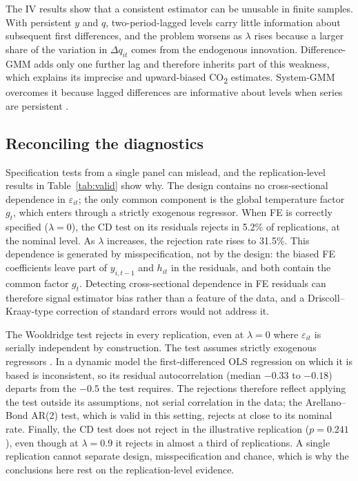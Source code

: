 \documentclass[11pt,a4paper]{article}
\newcommand{\COtwo}{CO\textsubscript{2}}
\begin{document}
The IV results show that a consistent estimator can be unusable in finite samples. With persistent $y$ and $q$, two-period-lagged levels carry little information about subsequent first differences, and the problem worsens as $\lambda$ rises because a larger share of the variation in $\Delta q_{it}$ comes from the endogenous innovation. Difference-GMM adds only one further lag and therefore inherits part of this weakness, which explains its imprecise and upward-biased \COtwo{} estimates. System-GMM overcomes it because lagged differences are informative about levels when series are persistent \citep{Blundell1998}.

\subsection{Reconciling the diagnostics}\label{sec:recon}

Specification tests from a single panel can mislead, and the replication-level results in Table~\ref{tab:valid} show why. The design contains no cross-sectional dependence in $\varepsilon_{it}$; the only common component is the global temperature factor $g_t$, which enters through a strictly exogenous regressor. When FE is correctly specified ($\lambda=0$), the CD test on its residuals rejects in 5.2\% of replications, at the nominal level. As $\lambda$ increases, the rejection rate rises to 31.5\%. This dependence is generated by misspecification, not by the design: the biased FE coefficients leave part of $y_{i,t-1}$ and $h_{it}$ in the residuals, and both contain the common factor $g_t$. Detecting cross-sectional dependence in FE residuals can therefore signal estimator bias rather than a feature of the data, and a Driscoll--Kraay-type correction of standard errors would not address it.

The Wooldridge test rejects in every replication, even at $\lambda=0$ where $\varepsilon_{it}$ is serially independent by construction. The test assumes strictly exogenous regressors \citep{Wooldridge2010,Drukker2003}. In a dynamic model the first-differenced OLS regression on which it is based is inconsistent, so its residual autocorrelation (median $-0.33$ to $-0.18$) departs from the $-0.5$ the test requires. The rejections therefore reflect applying the test outside its assumptions, not serial correlation in the data; the Arellano--Bond AR(2) test, which is valid in this setting, rejects at close to its nominal rate. Finally, the CD test does not reject in the illustrative replication ($p=0.241$), even though at $\lambda=0.9$ it rejects in almost a third of replications. A single replication cannot separate design, misspecification and chance, which is why the conclusions here rest on the replication-level evidence.
\end{document}
